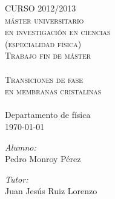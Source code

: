 \begin{titlepage}
\begin{center}


\textsc{\LARGE CURSO 2012/2013}\\[0.5cm]
\textsc{\LARGE máster universitario}\\[0.3cm]
\textsc{\LARGE en investigación en ciencias}\\[0.3cm]
\textsc{\LARGE (especialidad física)}\\[1.5cm]

\textsc{\Large Trabajo fin de máster}\\[0.5cm]

\HRule \\[0.4cm]
\textsc{{ \Huge Transiciones de fase\\[0.3cm] en membranas cristalinas}}\\[0.4cm]
\HRule \\[0.9cm]

{\Large Departamento de física}\\[1.6cm]
{\large \today}
\vfill
\begin{minipage}{0.4\textwidth}
\begin{flushleft} \large
\emph{Alumno:}\\
Pedro Monroy Pérez
\end{flushleft}
\end{minipage}
\begin{minipage}{0.4\textwidth}
\begin{flushright} \large
\emph{Tutor:} \\
Juan Jesús Ruiz Lorenzo
\end{flushright}
\end{minipage}




\end{center}
\end{titlepage}

